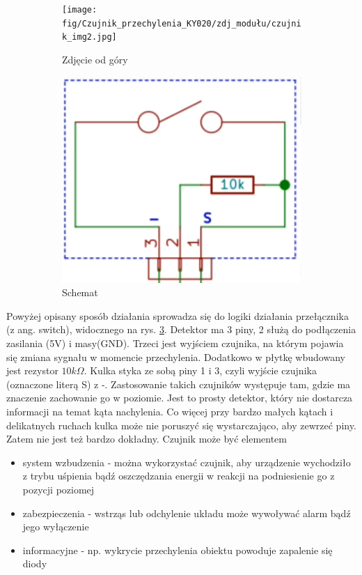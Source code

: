 \documentclass[11pt, a4paper]{article}
\begin{document}
\vspace{0.5cm}
\begin{figure}[h]
\begin{subfigure}{.5\textwidth}
\centering
   \texttt{[image: fig/Czujnik\_przechylenia\_KY020/zdj\_modułu/czujnik\_img2.jpg]}
   \caption{Zdjęcie od góry}
  \label{fig:sub1}
  \end{subfigure}%
\begin{subfigure}{.5\textwidth}
  \centering
  \includegraphics[width=.5\textwidth]{fig/Czujnik_przechylenia_KY020/zasada_dzialania/budowa1.png}
    \caption{Schemat}
    \label{sch}
  \end{subfigure}
  \caption{}%
\end{figure}

Powyżej opisany sposób działania sprowadza się do logiki działania przełącznika (z ang. switch), widocznego na rys. \ref{sch}.
Detektor ma 3 piny, 2 służą do podłączenia zasilania (5V) i masy(GND). Trzeci jest wyjściem czujnika, na którym pojawia się zmiana sygnału w momencie przechylenia. Dodatkowo w płytkę wbudowany jest rezystor $10k\Omega$. Kulka styka ze sobą piny 1 i 3, czyli wyjście czujnika (oznaczone literą S) z -. 
\newpage
Zastosowanie takich czujników występuje tam, gdzie ma znaczenie zachowanie go w poziomie. Jest to prosty detektor, który nie dostarcza informacji na temat kąta nachylenia. Co więcej przy bardzo małych kątach i delikatnych ruchach kulka może nie poruszyć się wystarczająco, aby zewrzeć piny. Zatem nie jest też bardzo dokładny. Czujnik może być elementem 

\begin{itemize}
    \item system wzbudzenia - można wykorzystać czujnik, aby urządzenie wychodziło z trybu uśpienia bądź oszczędzania energii w reakcji na podniesienie go z pozycji poziomej
    \item zabezpieczenia  - wstrząs lub odchylenie układu może wywoływać alarm bądź jego wyłączenie
    \item informacyjne - np. wykrycie przechylenia obiektu powoduje zapalenie się diody
\end{itemize}
\vspace{0.5cm}
\end{document}

